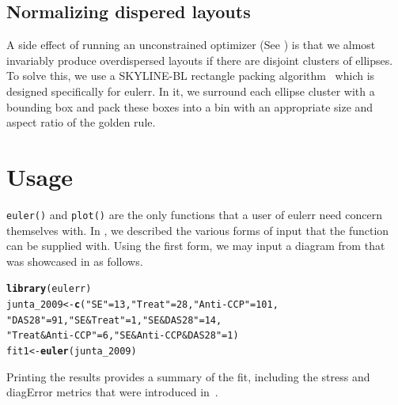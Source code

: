 \documentclass[
  oneside,
  openany,
  numbers=noendperiod,
  parskip=half,
  bibliography=totoc
]{scrbook}\usepackage[]{graphicx}\usepackage{xcolor}
\makeatletter
\newcommand{\hlnum}[1]{\textcolor[rgb]{0.686,0.059,0.569}{#1}}%
\newcommand{\hlstr}[1]{\textcolor[rgb]{0.192,0.494,0.8}{#1}}%
\newcommand{\hlstd}[1]{\textcolor[rgb]{0.345,0.345,0.345}{#1}}%
\newcommand{\hlkwb}[1]{\textcolor[rgb]{0.69,0.353,0.396}{#1}}%
\newcommand{\hlkwd}[1]{\textcolor[rgb]{0.737,0.353,0.396}{\textbf{#1}}}%
\newenvironment{kframe}{%
 \def\at@end@of@kframe{}%
 \ifinner\ifhmode%
  \def\at@end@of@kframe{\end{minipage}}%
  \begin{minipage}{\columnwidth}%
 \fi\fi%
 \def\FrameCommand##1{\hskip\@totalleftmargin \hskip-\fboxsep
 \colorbox{shadecolor}{##1}\hskip-\fboxsep
     \hskip-\linewidth \hskip-\@totalleftmargin \hskip\columnwidth}%
 \MakeFramed {\advance\hsize-\width
   \@totalleftmargin\z@ \linewidth\hsize
   \@setminipage}}%
 {\par\unskip\endMakeFramed%
 \at@end@of@kframe}
\newenvironment{knitrout}{}{} %
\newcommand{\pkg}[1]{{\fontseries{b}\selectfont #1}}
\newcommand{\code}[1]{\texttt{#1}}
\makeatother
\begin{document}
\section{Normalizing dispered layouts}
\label{sec:layout}

A side effect of running an unconstrained optimizer (See ) is that we almost invariably produce overdispersed layouts if there are disjoint clusters of ellipses. To solve this, we use a SKYLINE-BL rectangle packing algorithm~\citep{jylanki_2010} which is designed specifically for \pkg{eulerr}. In it, we surround each ellipse cluster with a bounding box and pack these boxes into a bin with an appropriate size and aspect ratio of the golden rule.

\chapter{Usage}\label{ch:usage}

\code{euler()} and \code{plot()} are the only functions that a user of
\pkg{eulerr} need concern themselves with. In , we described
the various forms of input that the function can be supplied with. Using the
first form, we may input a diagram from \citet{junta_2009} that was showcased in
\citet{wilkinson_2012} as follows.

\begin{knitrout}\small
{}\color{fgcolor}\begin{kframe}
\begin{alltt}
\hlkwd{library}\hlstd{(eulerr)}
\hlstd{junta_2009} \hlkwb{<-} \hlkwd{c}\hlstd{(}\hlstr{"SE"} \hlstd{=} \hlnum{13}\hlstd{,} \hlstr{"Treat"} \hlstd{=} \hlnum{28}\hlstd{,} \hlstr{"Anti-CCP"} \hlstd{=} \hlnum{101}\hlstd{,}
                \hlstr{"DAS28"} \hlstd{=} \hlnum{91}\hlstd{,} \hlstr{"SE&Treat"} \hlstd{=} \hlnum{1}\hlstd{,} \hlstr{"SE&DAS28"} \hlstd{=} \hlnum{14}\hlstd{,}
                \hlstr{"Treat&Anti-CCP"} \hlstd{=} \hlnum{6}\hlstd{,} \hlstr{"SE&Anti-CCP&DAS28"} \hlstd{=} \hlnum{1}\hlstd{)}
\hlstd{fit1} \hlkwb{<-} \hlkwd{euler}\hlstd{(junta_2009)}
\end{alltt}
\end{kframe}
\end{knitrout}

Printing the results provides a summary of the fit, including the stress and
diagError metrics that were introduced in~.
\end{document}
